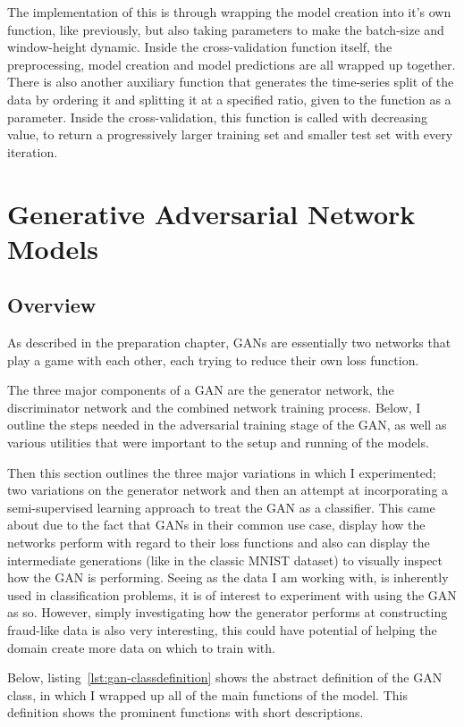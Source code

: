 \documentclass[12pt,a4paper,twoside]{report}
\begin{document}
The implementation of this is through wrapping the model creation into it's own function, like previously, but also taking parameters to make the batch-size and window-height dynamic. Inside the cross-validation function itself, the preprocessing, model creation and model predictions are all wrapped up together. There is also another auxiliary function that generates the time-series split of the data by ordering it and splitting it at a specified ratio, given to the function as a parameter. Inside the cross-validation, this function is called with decreasing value, to return a progressively larger training set and smaller test set with every iteration. 

\section{Generative Adversarial Network Models}

\subsection{Overview}
As described in the preparation chapter, GANs are essentially two networks that play a game with each other, each trying to reduce their own loss function. 

The three major components of a GAN are the generator network, the discriminator network and the combined network training process. Below, I outline the steps needed in the adversarial training stage of the GAN, as well as various utilities that were important to the setup and running of the models. 

Then this section outlines the three major variations in which I experimented; two variations on the generator network and then an attempt at incorporating a semi-supervised learning approach to treat the GAN as a classifier. This came about due to the fact that GANs in their common use case, display how the networks perform with regard to their loss functions and also can display the intermediate generations (like in the classic MNIST dataset) to visually inspect how the GAN is performing. Seeing as the data I am working with, is inherently used in classification problems, it is of interest to experiment with using the GAN as so. However, simply investigating how the generator performs at constructing fraud-like data is also very interesting, this could have potential of helping the domain create more data on which to train with. 

Below, listing~\ref{lst:gan-classdefinition} shows the abstract definition of the GAN class, in which I wrapped up all of the main functions of the model. This definition shows the prominent functions with short descriptions. 

\end{document}
